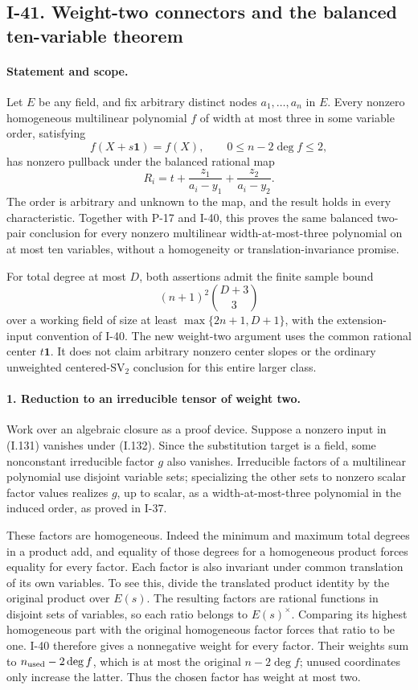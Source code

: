 \subsection{I-41. Weight-two connectors and the balanced ten-variable theorem}
\label{I-41}

\paragraph{Statement and scope.}
Let $E$ be any field, and fix arbitrary distinct nodes
$a_1,\ldots,a_n$ in $E$. Every nonzero homogeneous multilinear
polynomial $f$ of width at most three in some variable order,
satisfying
\[
 f(X+s\mathbf1)=f(X),\qquad 0\le n-2\deg f\le2,
 \tag{I.131}
\]
has nonzero pullback under the balanced rational map
\[
 R_i=t+\frac{z_1}{a_i-y_1}+\frac{z_2}{a_i-y_2}.
 \tag{I.132}
\]
The order is arbitrary and unknown to the map, and the result
holds in every characteristic. Together with P-17 and I-40,
this proves the same balanced two-pair conclusion for every
nonzero multilinear width-at-most-three polynomial on at most
ten variables, without a homogeneity or translation-invariance
promise.

For total degree at most $D$, both assertions admit the finite
sample bound
\[
 (n+1)^2\binom{D+3}{3}
 \tag{I.133}
\]
over a working field of size at least
$\max\{2n+1,D+1\}$, with the extension-input convention of I-40.
The new weight-two argument uses the common rational center
$t\mathbf1$. It does not claim arbitrary nonzero center slopes
or the ordinary unweighted centered-$\mathrm{SV}_2$ conclusion
for this entire larger class.

\paragraph{1. Reduction to an irreducible tensor of weight two.}
Work over an algebraic closure as a proof device. Suppose a
nonzero input in (I.131) vanishes under (I.132). Since the
substitution target is a field, some nonconstant irreducible
factor $g$ also vanishes. Irreducible factors of a multilinear
polynomial use disjoint variable sets; specializing the other
sets to nonzero scalar factor values realizes $g$, up to scalar,
as a width-at-most-three polynomial in the induced order, as
proved in I-37.

These factors are homogeneous. Indeed the minimum and maximum
total degrees in a product add, and equality of those degrees
for a homogeneous product forces equality for every factor.
Each factor is also invariant under common translation of its
own variables. To see this, divide the translated product
identity by the original product over $E(s)$. The resulting
factors are rational functions in disjoint sets of variables,
so each ratio belongs to $E(s)^\times$. Comparing its highest
homogeneous part with the original homogeneous factor forces
that ratio to be one. I-40 therefore gives a nonnegative weight
for every factor. Their weights sum to $n_{\rm used}-2\deg f$,
which is at most the original $n-2\deg f$; unused coordinates
only increase the latter. Thus the chosen factor has weight
at most two.

